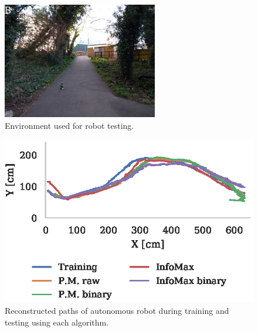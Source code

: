 \documentclass[letterpaper]{article}
\begin{document}
\begin{figure}[t]
    \centering
    \includegraphics[height=2in]{figures/robot_environment.jpg}
    \caption{Environment used for robot testing.}
    \label{fig:robot_environment}
\end{figure}

\begin{figure}[t]
    \centering
    \includegraphics{figures/robot_paths.eps}
    \caption{Reconstructed paths of autonomous robot during training and testing using each algorithm.}
    \label{fig:robot_paths}
\end{figure}
\end{document}
